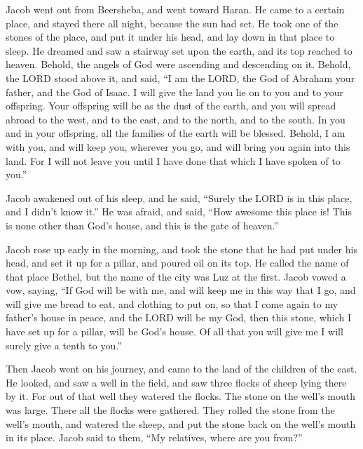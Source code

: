 \myverse{}Jacob went out from Beersheba, and went toward Haran. \myverse{}He came to a certain place, and stayed there all night, because the sun had set. He took one of the stones of the place, and put it under his head, and lay down in that place to sleep. \myverse{}He dreamed and saw a stairway set upon the earth, and its top reached to heaven. Behold, the angels of God were ascending and descending on it. \myverse{}Behold, the LORD stood above it, and said, “I am the LORD, the God of Abraham your father, and the God of Isaac. I will give the land you lie on to you and to your offspring. \myverse{}Your offspring will be as the dust of the earth, and you will spread abroad to the west, and to the east, and to the north, and to the south. In you and in your offspring, all the families of the earth will be blessed. \myverse{}Behold, I am with you, and will keep you, wherever you go, and will bring you again into this land. For I will not leave you until I have done that which I have spoken of to you.”

\myverse{}Jacob awakened out of his sleep, and he said, “Surely the LORD is in this place, and I didn’t know it.” \myverse{}He was afraid, and said, “How awesome this place is! This is none other than God’s house, and this is the gate of heaven.”

\myverse{}Jacob rose up early in the morning, and took the stone that he had put under his head, and set it up for a pillar, and poured oil on its top. \myverse{}He called the name of that place Bethel, but the name of the city was Luz at the first. \myverse{}Jacob vowed a vow, saying, “If God will be with me, and will keep me in this way that I go, and will give me bread to eat, and clothing to put on, \myverse{}so that I come again to my father’s house in peace, and the LORD will be my God, \myverse{}then this stone, which I have set up for a pillar, will be God’s house. Of all that you will give me I will surely give a tenth to you.”

\mychapter{}
\myverse*{}Then Jacob went on his journey, and came to the land of the children of the east.  \myverse{}He looked, and saw a well in the field, and saw three flocks of sheep lying there by it. For out of that well they watered the flocks. The stone on the well’s mouth was large.  \myverse{}There all the flocks were gathered. They rolled the stone from the well’s mouth, and watered the sheep, and put the stone back on the well’s mouth in its place.  \myverse{}Jacob said to them, “My relatives, where are you from?”

